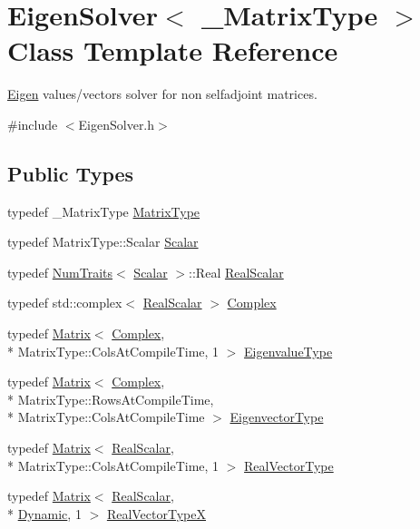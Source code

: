 \hypertarget{class_eigen_solver}{\section{Eigen\-Solver$<$ \-\_\-\-Matrix\-Type $>$ Class Template Reference}
\label{class_eigen_solver}
}


\hyperlink{namespace_eigen}{Eigen} values/vectors solver for non selfadjoint matrices.  




{\ttfamily \#include $<$Eigen\-Solver.\-h$>$}

\subsection*{Public Types}
\begin{DoxyCompactItemize}
\item 
typedef \-\_\-\-Matrix\-Type \hyperlink{class_eigen_solver_a2fd3a7b430468ffe4316cb8729c80bb2}{Matrix\-Type}
\item 
typedef Matrix\-Type\-::\-Scalar \hyperlink{class_eigen_solver_a40234d1d2c3dc9c76b05308329943e3f}{Scalar}
\item 
typedef \hyperlink{struct_num_traits}{Num\-Traits}$<$ \hyperlink{class_eigen_solver_a40234d1d2c3dc9c76b05308329943e3f}{Scalar} $>$\-::Real \hyperlink{class_eigen_solver_a90899b9a9b6155f766160e9ffc75117b}{Real\-Scalar}
\item 
typedef std\-::complex$<$ \hyperlink{class_eigen_solver_a90899b9a9b6155f766160e9ffc75117b}{Real\-Scalar} $>$ \hyperlink{class_eigen_solver_a5fef085778f87f8104a5226b9cd80933}{Complex}
\item 
typedef \hyperlink{class_matrix}{Matrix}$<$ \hyperlink{class_eigen_solver_a5fef085778f87f8104a5226b9cd80933}{Complex}, \\*
Matrix\-Type\-::\-Cols\-At\-Compile\-Time, 1 $>$ \hyperlink{class_eigen_solver_abeff77daec5eb8f177c90adc13a4fba0}{Eigenvalue\-Type}
\item 
typedef \hyperlink{class_matrix}{Matrix}$<$ \hyperlink{class_eigen_solver_a5fef085778f87f8104a5226b9cd80933}{Complex}, \\*
Matrix\-Type\-::\-Rows\-At\-Compile\-Time, \\*
Matrix\-Type\-::\-Cols\-At\-Compile\-Time $>$ \hyperlink{class_eigen_solver_a573e33fff25ab71e92f5f3d50eb80338}{Eigenvector\-Type}
\item 
typedef \hyperlink{class_matrix}{Matrix}$<$ \hyperlink{class_eigen_solver_a90899b9a9b6155f766160e9ffc75117b}{Real\-Scalar}, \\*
Matrix\-Type\-::\-Cols\-At\-Compile\-Time, 1 $>$ \hyperlink{class_eigen_solver_af62a93e73fdeb86320f622b727126eed}{Real\-Vector\-Type}
\item 
typedef \hyperlink{class_matrix}{Matrix}$<$ \hyperlink{class_eigen_solver_a90899b9a9b6155f766160e9ffc75117b}{Real\-Scalar}, \\*
\hyperlink{_constants_8h_adc9da5be31bdce40c25a92c27999c0e3}{Dynamic}, 1 $>$ \hyperlink{class_eigen_solver_a7696ab4a43324d85fb6df69de0d2148b}{Real\-Vector\-Type\-X}
\end{DoxyCompactItemize}
